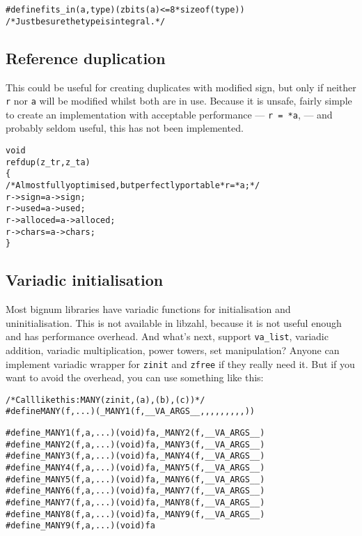 \begin{alltt}
   #define fits_in(a, type)  (zbits(a) <= 8 * sizeof(type))
   \textcolor{c}{/* \textrm{Just be sure the type is integral.} */}
\end{alltt}


\subsection{Reference duplication}
\label{sec:Reference duplication}

This could be useful for creating duplicates
with modified sign, but only if neither
{\tt r} nor {\tt a} will be modified whilst
both are in use. Because it is unsafe,
fairly simple to create an implementation
with acceptable performance — {\tt *r = *a},
— and probably seldom useful, this has not
been implemented.

\begin{alltt}
   void
   refdup(z_t r, z_t a)
   \{
       \textcolor{c}{/* \textrm{Almost fully optimised, but perfectly portable} *r = *a; */}
       r->sign    = a->sign;
       r->used    = a->used;
       r->alloced = a->alloced;
       r->chars   = a->chars;
   \}
\end{alltt}


\subsection{Variadic initialisation}
\label{sec:Variadic initialisation}

Most bignum libraries have variadic functions
for initialisation and uninitialisation. This
is not available in libzahl, because it is
not useful enough and has performance overhead.
And what's next, support {\tt va\_list},
variadic addition, variadic multiplication,
power towers, set manipulation? Anyone can
implement variadic wrapper for {\tt zinit} and
{\tt zfree} if they really need it. But if
you want to avoid the overhead, you can use
something like this:

\begin{alltt}
   /* \textrm{Call like this:} MANY(zinit, (a), (b), (c)) */
   #define MANY(f, ...)  (_MANY1(f, __VA_ARGS__,,,,,,,,,))
   
   #define _MANY1(f, a, ...)  (void)f a, _MANY2(f, __VA_ARGS__)
   #define _MANY2(f, a, ...)  (void)f a, _MANY3(f, __VA_ARGS__)
   #define _MANY3(f, a, ...)  (void)f a, _MANY4(f, __VA_ARGS__)
   #define _MANY4(f, a, ...)  (void)f a, _MANY5(f, __VA_ARGS__)
   #define _MANY5(f, a, ...)  (void)f a, _MANY6(f, __VA_ARGS__)
   #define _MANY6(f, a, ...)  (void)f a, _MANY7(f, __VA_ARGS__)
   #define _MANY7(f, a, ...)  (void)f a, _MANY8(f, __VA_ARGS__)
   #define _MANY8(f, a, ...)  (void)f a, _MANY9(f, __VA_ARGS__)
   #define _MANY9(f, a, ...)  (void)f a
\end{alltt}

